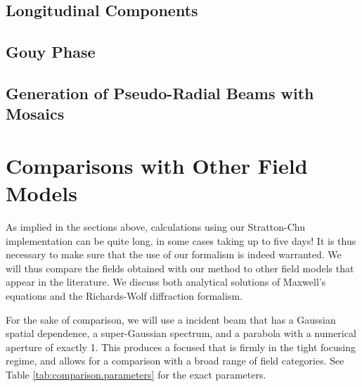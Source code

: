 \documentclass[11pt,SymmetricalJury]{inrsthesis/inrsthesis}
\begin{document}
\subsection{Longitudinal Components}


\subsection{Gouy Phase}


\subsection{Generation of Pseudo-Radial Beams with Mosaics}



\section{Comparisons with Other Field Models}

As implied in the sections above, calculations using our Stratton-Chu implementation
can be quite long, in some cases taking up to five days! It is thus necessary
to make sure that the use of our formalism is indeed warranted. We will thus
compare the fields obtained with our method to other field models that appear in
the literature. We discuss both analytical solutions of Maxwell's equations
and the Richards-Wolf diffraction formalism.

For the sake of comparison, we will use a incident beam that has a Gaussian
spatial dependence, a super-Gaussian spectrum, and a parabola with a
numerical aperture of exactly 1. This produces a focused that is firmly
in the tight focusing regime, and allows for a comparison with a broad range
of field categories. See Table \ref{tab:comparison.parameters} for the exact
parameters.
\end{document}
